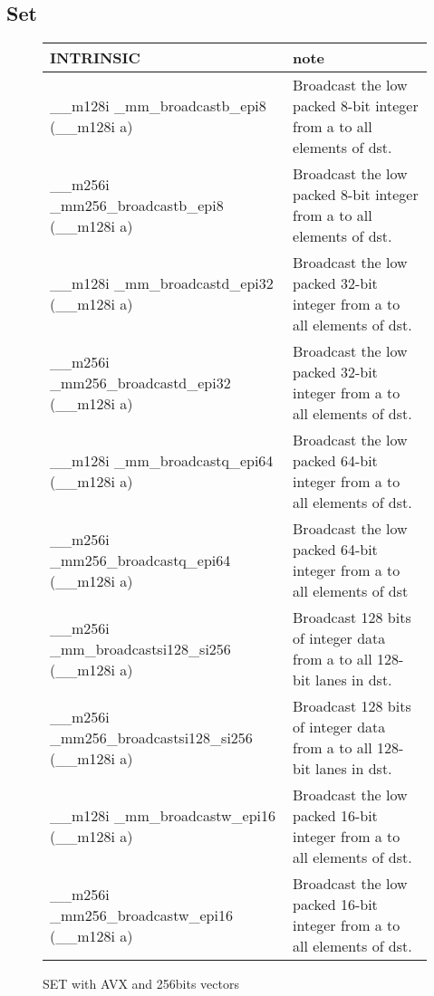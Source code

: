 \documentclass{article}
\begin{document}
\subsection{Set}
\vspace{1cm}
\begin{figure}[h!]
\noindent
\noindent\begin{tabular}{|l|l|}
  \hline
  INTRINSIC & note \\
  \hline
  \_\_m128i \_mm\_broadcastb\_epi8 (\_\_m128i a) & Broadcast the low packed 8-bit integer from a to all elements of dst. \\
    \hline
  \_\_m256i \_mm256\_broadcastb\_epi8 (\_\_m128i a) & Broadcast the low packed 8-bit integer from a to all elements of dst.\\
  \hline
  \_\_m128i \_mm\_broadcastd\_epi32 (\_\_m128i a) & Broadcast the low packed 32-bit integer from a to all elements of dst. \\ 
    \hline
    \_\_m256i \_mm256\_broadcastd\_epi32 (\_\_m128i a) & Broadcast the low packed 32-bit integer from a to all elements of dst.\\
    \hline
    \_\_m128i \_mm\_broadcastq\_epi64 (\_\_m128i a) & Broadcast the low packed 64-bit integer from a to all elements of dst. \\
    \hline
    \_\_m256i \_mm256\_broadcastq\_epi64 (\_\_m128i a) &  Broadcast the low packed 64-bit integer from a to all elements of dst \\
    \hline
   \_\_m256i \_mm\_broadcastsi128\_si256 (\_\_m128i a)  & Broadcast 128 bits of integer data from a to all 128-bit lanes in dst. \\
    \hline
  \_\_m256i \_mm256\_broadcastsi128\_si256 (\_\_m128i a)  & 
Broadcast 128 bits of integer data from a to all 128-bit lanes in dst. \\
\hline
\_\_m128i \_mm\_broadcastw\_epi16 (\_\_m128i a) & Broadcast the low packed 16-bit integer from a to all elements of dst. \\
\hline
\_\_m256i \_mm256\_broadcastw\_epi16 (\_\_m128i a) & Broadcast the low packed 16-bit integer from a to all elements of dst.\\

    \hline
\end{tabular}
\caption{SET with AVX and 256bits vectors}
\label{fig:SET lookup AVX 256bits instructions}
\end{figure}
\end{document}
